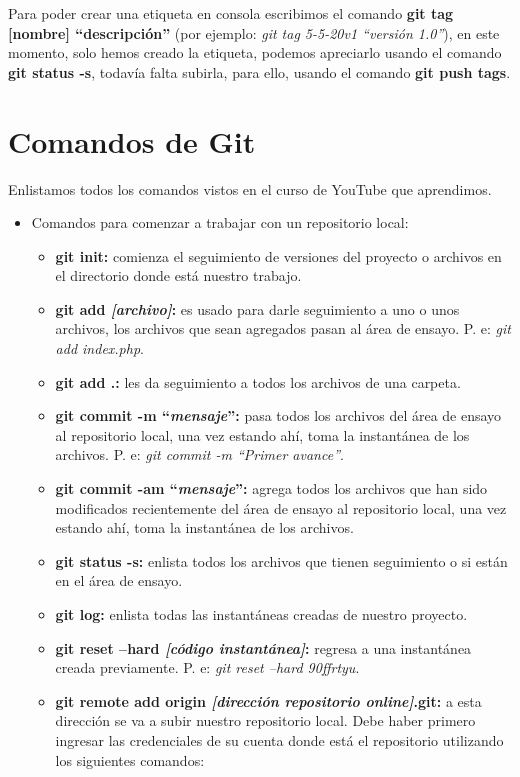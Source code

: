 Para poder crear una etiqueta en consola escribimos el comando \textbf{git tag [nombre] “descripción”} (por ejemplo: \textit{git tag 5-5-20v1 “versión 1.0”}), en este momento, solo hemos creado la etiqueta, podemos apreciarlo usando el comando \textbf{git status -s}, todavía falta subirla, para ello, usando el comando \textbf{git push tags}.



\section{Comandos de Git}
\hspace{0.55cm}Enlistamos todos los comandos vistos en el curso de YouTube que aprendimos.
\begin{itemize}
    \item Comandos para comenzar a trabajar con un repositorio local:
    \begin{itemize}
        \item \textbf{git init:} comienza el seguimiento de versiones del proyecto o archivos en el directorio donde está nuestro trabajo.
        \item \textbf{git add \textit{[archivo]}:} es usado para darle seguimiento a uno o unos archivos, los archivos que sean agregados pasan al área de ensayo. P. e: \textit{git add index.php}.
        \item \textbf{git add .: }les da seguimiento a todos los archivos de una carpeta.
        \item \textbf{git commit -m “\textit{mensaje}”:} pasa todos los archivos del área de ensayo al repositorio local, una vez estando ahí, toma la instantánea de los archivos. P. e: \textit{git commit -m “Primer avance”}.
        \item \textbf{git commit -am “\textit{mensaje}”:} agrega todos los archivos que han sido modificados recientemente del área de ensayo al repositorio local, una vez estando ahí, toma la instantánea de los archivos.
        \item \textbf{git status -s:} enlista todos los archivos que tienen seguimiento o si están en el área de ensayo.
        \item \textbf{git log:} enlista todas las instantáneas creadas de nuestro proyecto.
        \item \textbf{git reset –hard \textit{[código instantánea]}:} regresa a una instantánea creada previamente. P. e: \textit{git reset –hard 90ffrtyu}.
        \item \textbf{git remote add origin \textit{[dirección repositorio online]}.git:} a esta dirección se va a subir nuestro repositorio local. Debe haber primero ingresar las credenciales de su cuenta donde está el repositorio utilizando los siguientes comandos:

\end{itemize}
\end{itemize}
